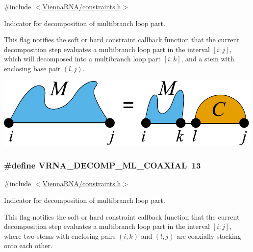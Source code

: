 {\ttfamily \#include $<$\hyperlink{constraints_8h}{Vienna\+R\+N\+A/constraints.\+h}$>$}



Indicator for decomposition of multibranch loop part. 

This flag notifies the soft or hard constraint callback function that the current decomposition step evaluates a multibranch loop part in the interval $[i:j]$, which will decomposed into a multibranch loop part $[i:k]$, and a stem with enclosing base pair $(l,j)$.

 
\begin{DoxyImageNoCaption}
  \mbox{\includegraphics[width=\textwidth,height=\textheight/2,keepaspectratio=true]{decomp_ml_ml_stem}}
\end{DoxyImageNoCaption}
\subsubsection[{\texorpdfstring{V\+R\+N\+A\+\_\+\+D\+E\+C\+O\+M\+P\+\_\+\+M\+L\+\_\+\+C\+O\+A\+X\+I\+AL}{VRNA_DECOMP_ML_COAXIAL}}]{\setlength{\rightskip}{0pt plus 5cm}\#define V\+R\+N\+A\+\_\+\+D\+E\+C\+O\+M\+P\+\_\+\+M\+L\+\_\+\+C\+O\+A\+X\+I\+AL~13}\hypertarget{group__constraints_ga4fe48d575830b16c208e280e01ab1497}{}\label{group__constraints_ga4fe48d575830b16c208e280e01ab1497}


{\ttfamily \#include $<$\hyperlink{constraints_8h}{Vienna\+R\+N\+A/constraints.\+h}$>$}



Indicator for decomposition of multibranch loop part. 

This flag notifies the soft or hard constraint callback function that the current decomposition step evaluates a multibranch loop part in the interval $[i:j]$, where two stems with enclosing pairs $(i,k)$ and $(l,j)$ are coaxially stacking onto each other.

